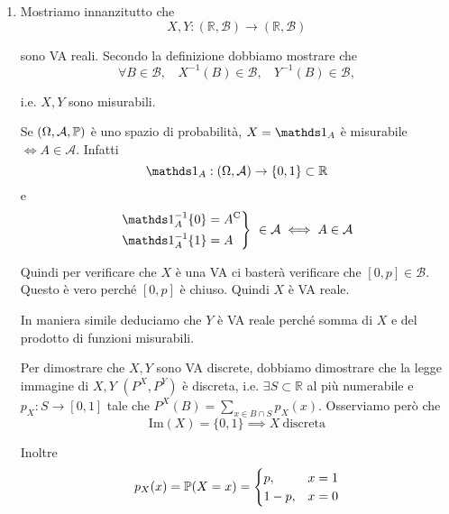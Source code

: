 \ParteSoluzioni






\Soluzione
\begin{enumerate}
\item Mostriamo innanzitutto che
\begin{equation*}
X,Y:(\mathbb{R} ,\mathcal{B})\rightarrow (\mathbb{R} ,\mathcal{B})
\end{equation*}

sono VA reali. Secondo la definizione dobbiamo mostrare che
\begin{equation*}
\forall B\in \mathcal{B} ,\ \ \ \ X^{-1}( B) \in \mathcal{B} ,\ \ \ \ Y^{-1}( B) \in \mathcal{B} ,
\end{equation*}

i.e. $X,Y$ sono misurabili.\begin{oss}
Se $( \Omega ,\mathcal{A} ,\mathbb{P})$ è uno spazio di probabilità, $X=\Ind_{A}$ è misurabile $\iff A\in \mathcal{A}$. Infatti
\begin{equation*}
\Ind_{A} :( \Omega ,\mathcal{A})\rightarrow \{0,1\} \subset \mathbb{R}
\end{equation*}
e
\begin{equation*}
\begin{drcases}
\Ind_{A}^{-1}\{0\} =A\complementary\\
\Ind_{A}^{-1}\{1\} =A
\end{drcases}
\ \in \mathcal{A} \iff A\in \mathcal{A}
\end{equation*}
\end{oss}

Quindi per verificare che $X$ è una VA ci basterà verificare che $[ 0,p] \in \mathcal{B}$. Questo è vero perché $[ 0,p]$ è chiuso. Quindi $X$ è VA reale.

In maniera simile deduciamo che $Y$ è VA reale perché somma di $X$ e del prodotto di funzioni misurabili.

Per dimostrare che $X,Y$ sono VA discrete, dobbiamo dimostrare che la legge immagine di $X,Y$ $\left( P^{X} ,P^{Y}\right)$ è discreta, i.e. $\exists S\subset \mathbb{R}$ al più numerabile e $p_{X} :S\rightarrow [ 0,1]$ tale che $P^{X}( B) =\sum\limits _{x\in B\cap S} p_{X}( x)$. Osserviamo però che
\begin{equation*}
\mathrm{Im}( X) =\{0,1\} \implies X\ \text{discreta}
\end{equation*}

Inoltre
\begin{equation*}
p_{X}( x) =\mathbb{P}( X=x) =\begin{cases}
p, & x=1\\
1-p, & x=0
\end{cases}
\end{equation*}


\end{enumerate}
